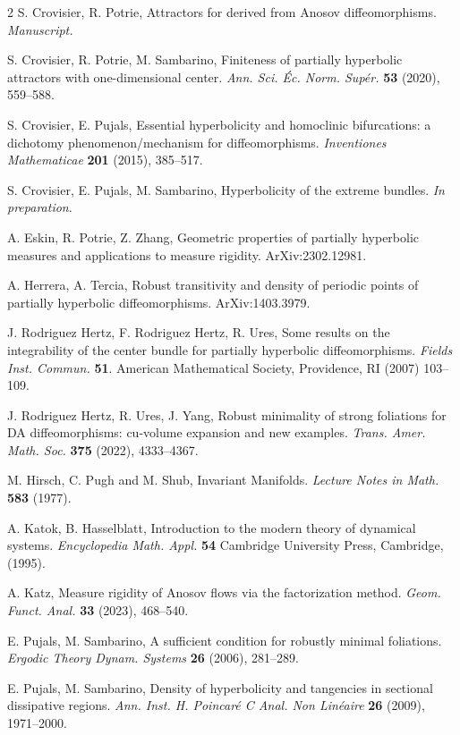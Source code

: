 \documentclass[a4paper,11pt]{amsart}
\numberwithin{equation}{section}     %
\theoremstyle{definition}
\theoremstyle{remark}
\begin{document}
\begin{thebibliography}{2}
 S. Crovisier, R. Potrie, Attractors for derived from Anosov diffeomorphisms. \emph{Manuscript.}

 S. Crovisier, R. Potrie, M. Sambarino, Finiteness of partially hyperbolic attractors with one-dimensional center.  \emph{Ann. Sci. \'Ec. Norm. Sup\'er.} {\bf 53} (2020), 559--588.

 S. Crovisier, E. Pujals, Essential hyperbolicity and homoclinic bifurcations: a dichotomy phenomenon/mechanism for diffeomorphisms. \emph{Inventiones Mathematicae} {\bf 201} (2015), 385--517. 

 S. Crovisier, E. Pujals, M. Sambarino, Hyperbolicity of the extreme bundles. \emph{In preparation}.

 A. Eskin, R. Potrie, Z. Zhang, Geometric properties of partially hyperbolic measures and applications to measure rigidity. ArXiv:2302.12981.

 A. Herrera, A. Tercia, Robust transitivity and density of periodic points of partially hyperbolic diffeomorphisms. ArXiv:1403.3979.

 J. Rodriguez Hertz, F. Rodriguez Hertz, R. Ures,  Some results on the integrability of the center bundle for partially hyperbolic diffeomorphisms. \emph{Fields Inst. Commun.} \textbf{51}.
American Mathematical Society, Providence, RI (2007) 103--109.


 J. Rodriguez Hertz, R. Ures, J. Yang, Robust minimality of strong foliations for DA diffeomorphisms: cu-volume expansion and new examples. \emph{Trans. Amer. Math. Soc.} \textbf{375} (2022), 4333--4367.

 M. Hirsch, C. Pugh and M. Shub, Invariant Manifolds.  \emph{Lecture Notes in Math.} {\bf 583} (1977).

 A. Katok, B. Hasselblatt, Introduction to the modern theory of dynamical systems.
\emph{Encyclopedia Math. Appl.} \textbf{54}
Cambridge University Press, Cambridge, (1995).

 A. Katz, Measure rigidity of Anosov flows via the factorization method. \emph{Geom. Funct. Anal.} {\bf 33} (2023), 468--540.

 E. Pujals, M. Sambarino, A sufficient condition for robustly minimal foliations. \emph{Ergodic Theory Dynam. Systems} {\bf 26} (2006), 281--289.

 E. Pujals, M. Sambarino, Density of hyperbolicity and tangencies in sectional dissipative regions. \emph{Ann. Inst. H. Poincar\'e C Anal. Non Lin\'eaire} {\bf 26} (2009), 1971--2000.


\end{thebibliography}
\end{document}
